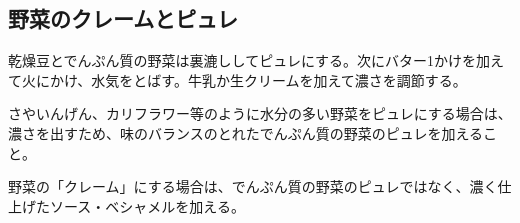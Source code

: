 \hypertarget{cremes-et-puree-de-legumes}{%
\subsection{野菜のクレームとピュレ}\label{cremes-et-puree-de-legumes}}

乾燥豆とでんぷん質の野菜は裏漉ししてピュレにする。次にバター1かけを加えて火にかけ、水気をとばす。牛乳か生クリームを加えて濃さを調節する。

さやいんげん、カリフラワー等のように水分の多い野菜をピュレにする場合は、濃さを出すため、味のバランスのとれたでんぷん質の野菜のピュレを加えること。

野菜の「クレーム」にする場合は、でんぷん質の野菜のピュレではなく、濃く仕上げたソース・ベシャメルを加える。
